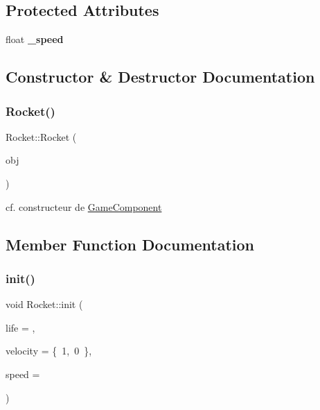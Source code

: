 \subsection*{Protected Attributes}
\begin{DoxyCompactItemize}
\item 
\hypertarget{class_rocket_aa0c252aa8094bc942d743aed643fcf08}{}\label{class_rocket_aa0c252aa8094bc942d743aed643fcf08} 
float {\bfseries \+\_\+speed}
\end{DoxyCompactItemize}


\subsection{Constructor \& Destructor Documentation}
\hypertarget{class_rocket_aa1ab185c1ec59b4983114b41efd59ea0}{}\label{class_rocket_aa1ab185c1ec59b4983114b41efd59ea0} 
\subsubsection{\texorpdfstring{Rocket()}{Rocket()}}
{\footnotesize\ttfamily Rocket\+::\+Rocket (\begin{DoxyParamCaption}\item[{\hyperlink{class_game_object}{Game\+Object} $\ast$}]{obj }\end{DoxyParamCaption})}

cf. constructeur de \hyperlink{class_game_component}{Game\+Component} 

\subsection{Member Function Documentation}
\hypertarget{class_rocket_a073b8a2f1f13fe147973413803438860}{}\label{class_rocket_a073b8a2f1f13fe147973413803438860} 
\subsubsection{\texorpdfstring{init()}{init()}}
{\footnotesize\ttfamily void Rocket\+::init (\begin{DoxyParamCaption}\item[{int}]{life = {},  }\item[{\hyperlink{structvector2}{vector2}}]{velocity = {\ttfamily \{~1,~0~\}},  }\item[{float}]{speed = {} }\end{DoxyParamCaption})}



